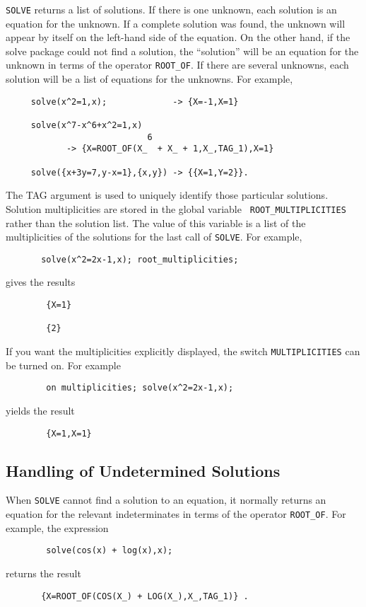 \hypertarget{operator:ROOT_OF}{}
{\tt SOLVE} returns a list of solutions.  If there is one unknown, each
solution is an equation for the unknown.  If a complete solution was
found, the unknown will appear by itself on the left-hand side of the
equation.  On the other hand, if the solve package could not find a
solution, the ``solution'' will be an equation for the unknown in terms
of the operator {\tt ROOT\_OF}. If there
are several unknowns, each solution will be a list of equations for the
unknowns.  For example,
\begin{verbatim}
     solve(x^2=1,x);             -> {X=-1,X=1}

     solve(x^7-x^6+x^2=1,x)
                            6
            -> {X=ROOT_OF(X_  + X_ + 1,X_,TAG_1),X=1}

     solve({x+3y=7,y-x=1},{x,y}) -> {{X=1,Y=2}}.
\end{verbatim}
\hypertarget{reserved:ROOT_MULTIPLICITIES}{}
The TAG argument is used to uniquely identify those particular solutions.
Solution multiplicities are stored in the global variable {\tt
ROOT\_MULTIPLICITIES} rather than the solution list.  The value of this
variable is a list of the multiplicities of the solutions for the last
call of {\tt SOLVE}.  For example,
\begin{verbatim}
       solve(x^2=2x-1,x); root_multiplicities;
\end{verbatim}
gives the results
\begin{verbatim}
        {X=1}

        {2}
\end{verbatim}

\hypertarget{switch:MULTIPLICITIES}{}
If you want the multiplicities explicitly displayed, the switch
{\tt MULTIPLICITIES} can be turned on. For example
\begin{verbatim}
        on multiplicities; solve(x^2=2x-1,x);
\end{verbatim}
yields the result
\begin{verbatim}
        {X=1,X=1}
\end{verbatim}

\subsection{Handling of Undetermined Solutions}
When {\tt SOLVE} cannot find a solution to an equation, it normally
returns an equation for the relevant indeterminates in terms of the
operator {\tt ROOT\_OF}.  For example, the expression
\begin{verbatim}
        solve(cos(x) + log(x),x);
\end{verbatim}
returns the result
\begin{verbatim}
       {X=ROOT_OF(COS(X_) + LOG(X_),X_,TAG_1)} .
\end{verbatim}

